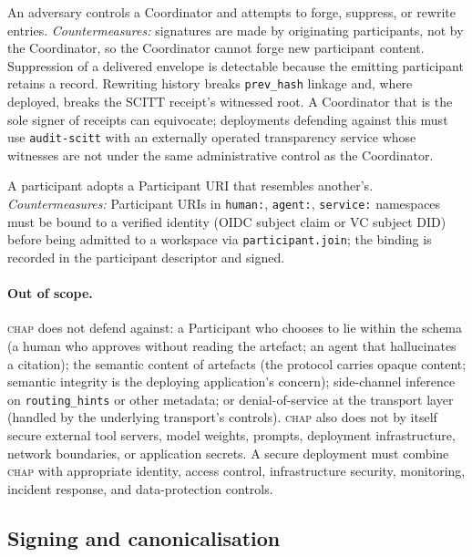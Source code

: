 \documentclass[11pt]{article}
\newcommand{\chap}{\textsc{chap}}
\begin{document}
\begin{description}[leftmargin=!,labelwidth=2.6cm]
    \item[\textbf{Compromised Coordinator.}] An adversary controls a Coordinator and attempts to forge, suppress, or rewrite entries. \emph{Countermeasures:} signatures are made by originating participants, not by the Coordinator, so the Coordinator cannot forge new participant content. Suppression of a delivered envelope is detectable because the emitting participant retains a record. Rewriting history breaks \texttt{prev\_hash} linkage and, where deployed, breaks the SCITT receipt's witnessed root. A Coordinator that is the sole signer of receipts can equivocate; deployments defending against this must use \texttt{audit-scitt} with an externally operated transparency service whose witnesses are not under the same administrative control as the Coordinator.

    \item[\textbf{Identity confusion.}] A participant adopts a Participant URI that resembles another's. \emph{Countermeasures:} Participant URIs in \texttt{human:}, \texttt{agent:}, \texttt{service:} namespaces must be bound to a verified identity (OIDC subject claim or VC subject DID) before being admitted to a workspace via \texttt{participant.join}; the binding is recorded in the participant descriptor and signed.
\end{description}

\paragraph{Out of scope.} \chap{} does not defend against: a Participant who chooses to lie within the schema (a human who approves without reading the artefact; an agent that hallucinates a citation); the semantic content of artefacts (the protocol carries opaque content; semantic integrity is the deploying application's concern); side-channel inference on \texttt{routing\_hints} or other metadata; or denial-of-service at the transport layer (handled by the underlying transport's controls). \chap{} also does not by itself secure external tool servers, model weights, prompts, deployment infrastructure, network boundaries, or application secrets. A secure deployment must combine \chap{} with appropriate identity, access control, infrastructure security, monitoring, incident response, and data-protection controls.

\subsection{Signing and canonicalisation}
\end{document}
